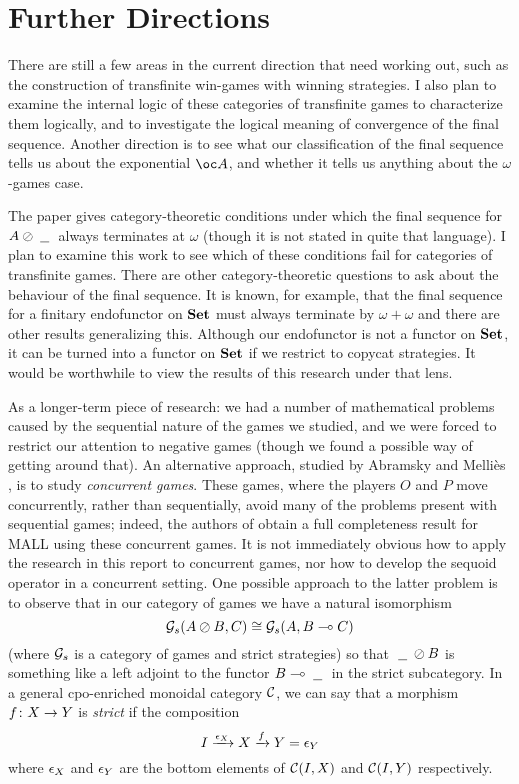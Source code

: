 \documentclass[11pt]{article} %
\begin{document}
\section{Further Directions}

There are still a few areas in the current direction that need working out, such as the construction of transfinite win-games with winning strategies.  I also plan to examine the internal logic of these categories of transfinite games to characterize them logically, and to investigate the logical meaning of convergence of the final sequence.  Another direction is to see what our classification of the final sequence tells us about the exponential $\oc A$, and whether it tells us anything about the $\omega$-games case.  

The paper \cite{MelliesCofCommCom} gives category-theoretic conditions under which the final sequence for $A\oslash\;\underline{\hspace{1.5ex}}\;$ always terminates at $\omega$ (though it is not stated in quite that language).  I plan to examine this work to see which of these conditions fail for categories of transfinite games.  There are other category-theoretic questions to ask about the behaviour of the final sequence.  It is known, for example, that the final sequence for a finitary endofunctor on ${\normalfont\textbf{Set}}$ must always terminate by $\omega+\omega$ \cite{finalseq} and there are other results generalizing this.  Although our endofunctor is not a functor on ${\normalfont\textbf{Set}}$, it can be turned into a functor on ${\normalfont\textbf{Set}}$ if we restrict to copycat strategies.  It would be worthwhile to view the results of this research under that lens.  

As a longer-term piece of research: we had a number of mathematical problems caused by the sequential nature of the games we studied, and we were forced to restrict our attention to negative games (though we found a possible way of getting around that).  An alternative approach, studied by Abramsky and Melli\`{e}s \cite{AMConcurrent}, is to study \emph{concurrent games}.  These games, where the players $O$ and $P$ move concurrently, rather than sequentially, avoid many of the problems present with sequential games; indeed, the authors of \cite{AMConcurrent} obtain a full completeness result for MALL using these concurrent games.  It is not immediately obvious how to apply the research in this report to concurrent games, nor how to develop the sequoid operator in a concurrent setting.  One possible approach to the latter problem is to observe that in our category of games we have a natural isomorphism
\[
  \mathcal G_s(A\oslash B,C)\cong\mathcal G_s(A,B\multimap C)
  \]
(where $\mathcal G_s$ is a category of games and strict strategies) so that $\;\underline{\hspace{1.5ex}}\;\oslash B$ is something like a left adjoint to the functor $B\multimap\;\underline{\hspace{1.5ex}}\;$ in the strict subcategory.  In a general cpo-enriched monoidal category ${\mathcal{C}}$, we can say that a morphism $f\colon X\to Y$ is \emph{strict} if the composition
\[
  I\xrightarrow{\epsilon_X}X\xrightarrow{f}Y = \epsilon_Y
  \]
where $\epsilon_X$ and $\epsilon_Y$ are the bottom elements of ${\mathcal{C}}(I,X)$ and ${\mathcal{C}}(I,Y)$ respectively.  
\end{document}
